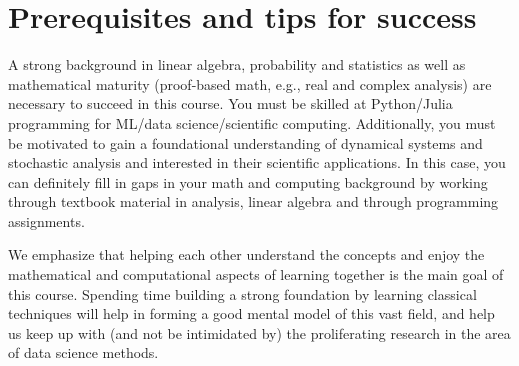 \documentclass[12pt]{article}
\begin{document}
\section{Prerequisites and tips for success}
A strong background in linear algebra, probability and statistics as well as mathematical maturity (proof-based math, e.g., real and complex analysis) are necessary to succeed in this course. You must be skilled at Python/Julia programming for ML/data science/scientific computing. Additionally, you must be motivated to gain a foundational understanding of dynamical systems and stochastic analysis and interested in their scientific applications. In this case, you can definitely fill in gaps in your math and computing background by working through textbook material in analysis, linear algebra and through programming assignments.

We emphasize that helping each other understand the concepts and enjoy the mathematical and computational aspects of learning together is the main goal of this course. Spending time building a strong foundation by learning classical techniques will help in forming a good mental model of this vast field, and help us keep up with (and not be intimidated by) the proliferating research in the area of data science methods.
\end{document}
